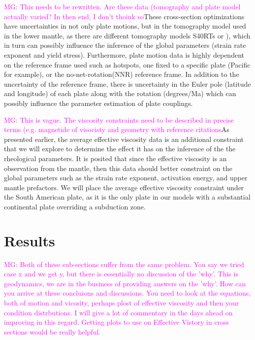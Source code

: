 \documentclass[12pt]{article}
\newcommand{\mgnote}[1]{\textcolor{magenta}{MG: #1}}
\begin{document}
\mgnote{This needs to be rewritten. Are these data (tomography and plate model actually varied? In then end, I don't thoink so}These cross-section optimizations have uncertainties in not only plate motions, but in the tomography model used in the lower mantle, as there are different tomography models S40RTs or \citep{simmons2012llnl}), which in turn can possibly influence the inference of the global parameters (strain rate exponent and yield stress). Furthermore, plate motion data is highly dependent on the reference frame used such as hotspots, one fixed to a specific plate (Pacific for example), or the no-net-rotation(NNR) reference frame. In addition to the uncertainty of the reference frame, there is uncertainty in the Euler pole (latitude and longitude) of each plate along with the rotation (degrees/Ma) which can possibly influence the parameter estimation of plate couplings.


\mgnote{This is vague. The viscosity constraints need to be described in precise terms (e.g. magnetide of visocisty and geometry with reference citations}As presented earlier, the average effective viscosity data is an additional constraint that we will explore to determine the effect it has on the inference of the the rheological parameters. It is posited that since the effective viscosity is an observation from the mantle, then this data should better constraint on the global parameters such as the strain rate exponent, activation energy, and upper mantle prefactors. We will place the average effective viscosity constraint under the South American plate, as it is the only plate in our models with a substantial continental plate overriding a subduction zone.

\section{Results}

\mgnote{Both of these sub-sections suffer from the same problem. You say we tried case x and we get y, but there is essentially no discussion of the 'why'. This is geodynamics, we are in the business of providing answers on the 'why'. How can you arrive at these concluions and discussions. You need to look at the equations, both of motion and  vicosity, perhaps plost of effective viscosity and then your condition distrbutions. I will give a lot of commentary in the days ahead on improving in this regard. Getting plots to use on Effective Vistory in cross sections would be really helpful.}
\end{document}
